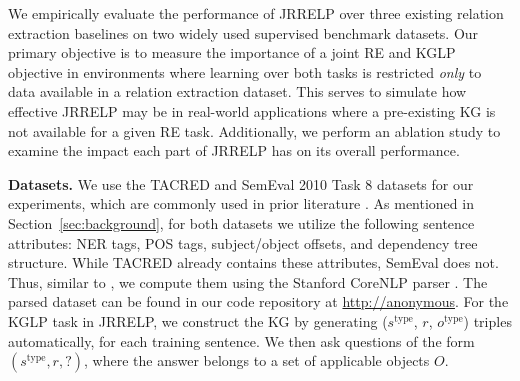 We empirically evaluate the performance of JRRELP over three existing relation extraction baselines on two widely used supervised benchmark datasets.
Our primary objective is to measure the importance of a joint RE and KGLP objective in environments where learning over both tasks is restricted {\em only} to data available in a relation extraction dataset.
This serves to simulate how effective JRRELP may be in real-world applications where a pre-existing KG is not available for a given RE task.
Additionally, we perform an ablation study to examine the impact each part of JRRELP has on its overall performance.

\textbf{Datasets.}
We use the TACRED \cite{palstm} and SemEval 2010 Task 8 \cite{semeval} datasets for our experiments, which are commonly used in prior literature \citep[e.g.,][]{palstm, cgcn, aggcn, bert-em}.
As mentioned in Section~\ref{sec:background}, for both datasets we utilize the following sentence attributes: NER tags, POS tags, subject/object offsets, and dependency tree structure.
While TACRED already contains these attributes, SemEval does not.
Thus, similar to \cite{palstm, cgcn}, we compute them using the Stanford CoreNLP parser \cite{stanfordcorenlp}.
The parsed dataset can be found in our code repository at \url{http://anonymous}.
For the KGLP task in JRRELP, we construct the KG by generating ($s^{\textrm{type}}$, $r$, $o^{\textrm{type}}$) triples automatically, for each training sentence.
We then ask questions of the form $(s^{\textrm{type}}, r, ?)$, where the answer belongs to a set of applicable objects $O$.

